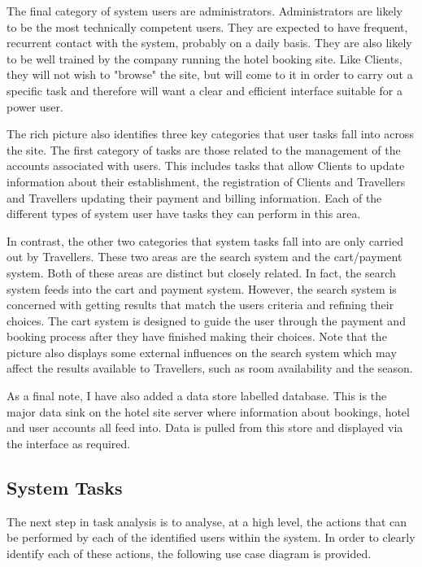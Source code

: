 \documentclass{article}
\begin{document}
The final category of system users are administrators. Administrators are likely to be the most technically competent users. They are expected to have frequent, recurrent contact with the system, probably on a daily basis. They are also likely to be well trained by the company running the hotel booking site. Like Clients, they will not wish to "browse" the site, but will come to it in order to carry out a specific task and therefore will want a clear and efficient interface suitable for a power user.

The rich picture also identifies three key categories that user tasks fall into across the site. The first category of tasks are those related to the management of the accounts associated with users. This includes tasks that allow Clients to update information about their establishment, the registration of Clients and Travellers and Travellers updating their payment and billing information. Each of the different types of system user have tasks they can perform in this area.

In contrast, the other two categories that system tasks fall into are only carried out by Travellers. These two areas are the search system and the cart/payment system. Both of these areas are distinct but closely related. In fact, the search system feeds into the cart and payment system. However, the search system is concerned with getting results that match the users criteria and refining their choices. The cart system is designed to guide the user through the payment and booking process after they have finished making their choices. Note that the picture also displays some external influences on the search system which may affect the results available to Travellers, such as room availability and the season.

As a final note, I have also added a data store labelled database. This is the major data sink on the hotel site server where information about bookings, hotel and user accounts all feed into. Data is pulled from this store and displayed via the interface as required.

\subsection{System Tasks}
The next step in task analysis is to analyse, at a high level, the actions that can be performed by each of the identified users within the system. In order to clearly identify each of these actions, the following use case diagram is provided.
\end{document}
